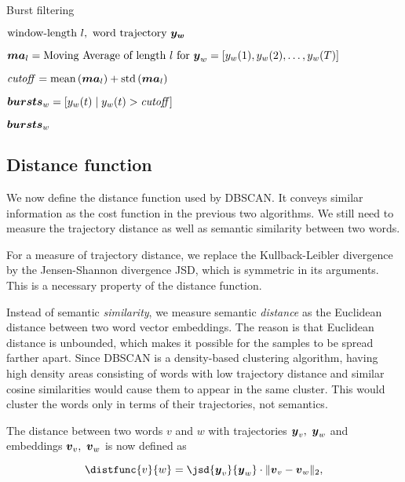 \begin{algorithm}[H]
\begin{algorithmic}[1]
\caption{Burst filtering}
\label{alg:burst-filtering}
\Input $\text{window-length} \ l,\ \text{word trajectory} \ \vect{\traj_{w}}$

\State $\vect{MA}_{l} = \text{Moving Average of length} ~ l ~ \text{for} ~ \vect{\traj}_{w} = \left[ \traj_{w}(1), \traj_{w}(2), \dots, \traj_{w}(\streamlen) \right]$

\State $\mathit{cutoff} = \text{mean} \left( \vect{MA}_{l} \right) + \text{std} \left( \vect{MA}_{l} \right)$

\State $\vect{bursts}_{w} = \left[ \traj_{w}(t) \mid \traj_{w	}(t) > \mathit{cutoff} \right]$

\Output $\vect{bursts}_{w}$
\end{algorithmic}
\end{algorithm}


\subsection{Distance function}
We now define the distance function used by DBSCAN. It conveys similar information as the cost function in the previous two algorithms. We still need to measure the trajectory distance as well as semantic similarity between two words.

For a measure of trajectory distance, we replace the Kullback-Leibler divergence by the Jensen-Shannon divergence JSD, which is symmetric in its arguments. This is a necessary property of the distance function.

Instead of semantic \textit{similarity}, we measure semantic \textit{distance} as the Euclidean distance between two word vector embeddings. The reason is that Euclidean distance is unbounded, which makes it possible for the samples to be spread farther apart. Since DBSCAN is a density-based clustering algorithm, having high density areas consisting of words with low trajectory distance and similar cosine similarities would cause them to appear in the same cluster. This would cluster the words only in terms of their trajectories, not semantics.

The distance between two words $v$ and $w$ with trajectories $\vect{\traj}_{v},\ \vect{\traj}_{w}$ and embeddings $\embed_{v},\ \embed_{w}$ is now defined as

\begin{equation}
	\distfunc{v}{w} = \jsd{\vect{\traj}_{v}}{\vect{\traj}_{w}} \cdot \| \embed_{v} - \embed_{w}\|_{2},
\end{equation}

